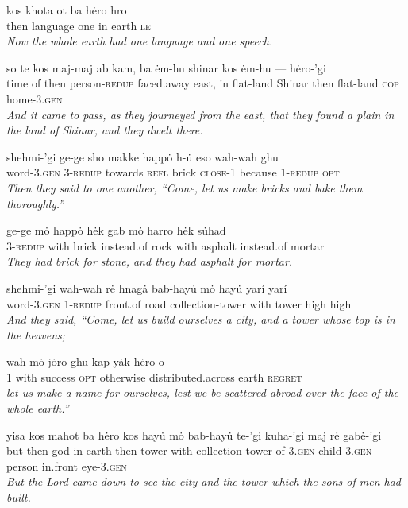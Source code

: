 \documentclass{article}[10pt]
\begin{document}
\begin{exe}

\ex
\gll kos khota ot ba h\.{e}ro hro\\
then language one in earth \textsc{le}\\
\trans \emph{Now the whole earth had one language and one speech.}

\ex
\gll so te kos maj-maj ab kam, ba \.{e}m-hu shinar kos \.{e}m-hu --- h\.{e}ro-'gi \\
time of then person-\textsc{redup} faced.away east, in flat-land Shinar then flat-land \textsc{cop} home-\textsc{3.gen} \\
\trans \emph{And it came to pass, as they journeyed from the east, that they found a plain in the land of Shinar, and they dwelt there.}

\ex
\gll shehmi-'gi ge-ge sho makke happ\.{o} h-\.{u} eso wah-wah ghu\\
word-\textsc{3.gen} 3-\textsc{redup} towards \textsc{refl} brick \textsc{close}-1 because 1-\textsc{redup} \textsc{opt}\\
\trans \emph{Then they said to one another, ``Come, let us make bricks and bake them thoroughly.''}

\ex
\gll ge-ge m\.{o} happ\.{o} h\.{e}k gab m\.{o} harro h\.{e}k s\.{u}had\\
3-\textsc{redup} with brick instead.of rock with asphalt instead.of mortar\\
\trans \emph{They had brick for stone, and they had asphalt for mortar.}

\ex
\gll shehmi-'gi wah-wah r\.{e} hnag\.{a} bab-hay\.{u} m\.{o} hay\.{u} yar\'{i} yar\'{i}\\
word-\textsc{3.gen} 1-\textsc{redup} front.of road collection-tower with tower high high\\
\trans \emph{And they said, ``Come, let us build ourselves a city, and a tower whose top is in the heavens;}

\ex
\gll wah m\.{o} j\.{o}ro ghu kap y\.{a}k h\.{e}ro o\\
1 with success \textsc{opt} otherwise distributed.across earth \textsc{regret}\\
\trans \emph{let us make a name for ourselves, lest we be scattered abroad over the face of the whole earth.''}

\ex
\gll yisa kos mahot ba h\.{e}ro kos hay\.{u} m\.{o} bab-hay\.{u} te-'gi kuha-'gi maj r\.{e} gab\.{e}-'gi\\
but then god in earth then tower with collection-tower of-\textsc{3.gen} child-\textsc{3.gen} person in.front eye-\textsc{3.gen}\\
\trans \emph{But the Lord came down to see the city and the tower which the sons of men had built.}


\end{exe}
\end{document}
